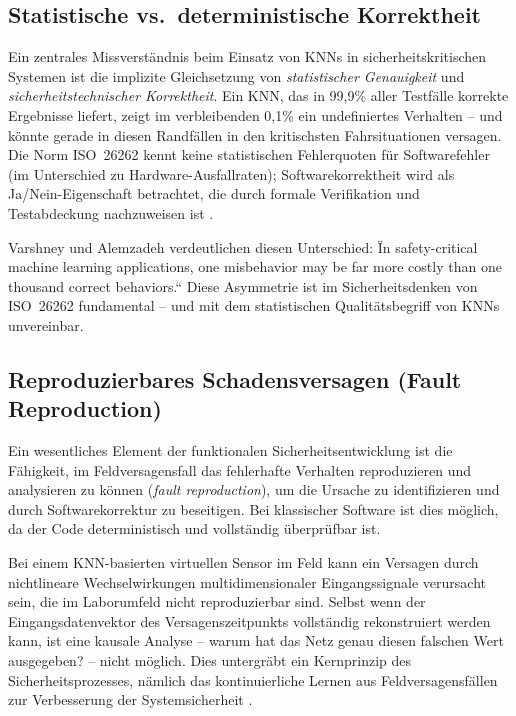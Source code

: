 ﻿\documentclass[12pt,a4paper]{article}
\begin{document}
\subsection{Statistische vs.\ deterministische Korrektheit}
\label{subsec:stat_det}

Ein zentrales Missverst\"andnis beim Einsatz von KNNs in
sicherheitskritischen Systemen ist die implizite Gleichsetzung von
\emph{statistischer Genauigkeit} und \emph{sicherheitstechnischer Korrektheit}.
Ein KNN, das in 99{,}9\% aller Testf\"alle korrekte Ergebnisse liefert, zeigt
im verbleibenden 0{,}1\% ein undefiniertes Verhalten -- und k\"onnte gerade in
diesen Randf\"allen in den kritischsten Fahrsituationen versagen. Die Norm
ISO~26262 kennt keine statistischen Fehlerquoten f\"ur Softwarefehler (im
Unterschied zu Hardware-Ausfallraten); Softwarekorrektheit wird als Ja/Nein-Eigenschaft
betrachtet, die durch formale Verifikation und Testabdeckung nachzuweisen ist
\cite{iso26262_6}.

Varshney und Alemzadeh \cite{Varshney2017} verdeutlichen diesen Unterschied:
\"In safety-critical machine learning applications, one misbehavior may be
far more costly than one thousand correct behaviors.`` Diese Asymmetrie ist im
Sicherheitsdenken von ISO~26262 fundamental -- und mit dem statistischen
Qualit\"atsbegriff von KNNs unvereinbar.

\subsection{Reproduzierbares Schadensversagen (Fault Reproduction)}
\label{subsec:fault_repro}

Ein wesentliches Element der funktionalen Sicherheitsentwicklung ist die F\"ahigkeit,
im Feldversagensfall das fehlerhafte Verhalten reproduzieren und analysieren zu
k\"onnen (\emph{fault reproduction}), um die Ursache zu identifizieren und durch
Softwarekorrektur zu beseitigen. Bei klassischer Software ist dies m\"oglich, da
der Code deterministisch und vollst\"andig \"uberpr\"ufbar ist.

Bei einem KNN-basierten virtuellen Sensor im Feld kann ein Versagen durch nichtlineare
Wechselwirkungen multidimensionaler Eingangssignale verursacht sein, die im
Laborumfeld nicht reproduzierbar sind. Selbst wenn der Eingangsdatenvektor des
Versagenszeitpunkts vollst\"andig rekonstruiert werden kann, ist eine kausale Analyse
-- warum hat das Netz genau diesen falschen Wert ausgegeben? -- nicht m\"oglich.
Dies untergr\"abt ein Kernprinzip des Sicherheitsprozesses, n\"amlich das
kontinuierliche Lernen aus Feldversagensf\"allen zur Verbesserung der Systemsicherheit
\cite{Leveson2011}.
\end{document}
